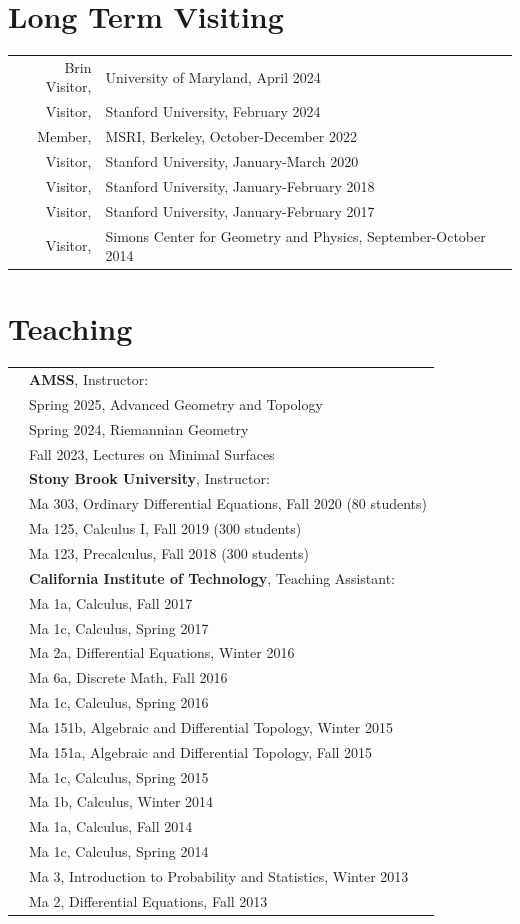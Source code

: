 \documentclass[a4paper,10pt]{article}
\begin{document}
\section*{Long Term Visiting}
\begin{tabular}{rl}
    Brin Visitor, & University of Maryland, April 2024 \\
    Visitor, & Stanford University, February 2024 \\
    Member, & MSRI, Berkeley, October-December 2022 \\
    Visitor, & Stanford University, January-March 2020 \\
    Visitor, & Stanford University, January-February 2018 \\
    Visitor, & Stanford University, January-February 2017 \\
    Visitor, & Simons Center for Geometry and Physics, September-October 2014 \\
\end{tabular}

\section*{Teaching}
\begin{tabular}{rl}
    &\textbf{AMSS}, Instructor:  \\
    &Spring 2025, Advanced Geometry and Topology \\
    &Spring 2024, Riemannian Geometry\\
    & Fall 2023, Lectures on Minimal Surfaces \\
    &\textbf{Stony Brook University}, Instructor: \\
    & Ma 303, Ordinary Differential Equations, Fall 2020 (80 students) \\
    & Ma 125, Calculus I, Fall 2019 (300 students) \\
    & Ma 123, Precalculus, Fall 2018 (300 students) \\
    &\textbf{California Institute of Technology}, Teaching Assistant: \\
    & Ma 1a, Calculus, Fall 2017 \\
    & Ma 1c, Calculus, Spring 2017 \\
    & Ma 2a, Differential Equations, Winter 2016 \\
    & Ma 6a, Discrete Math, Fall 2016 \\
    & Ma 1c, Calculus, Spring 2016 \\
    & Ma 151b, Algebraic and Differential Topology, Winter 2015 \\
    & Ma 151a, Algebraic and Differential Topology, Fall 2015 \\
    & Ma 1c, Calculus, Spring 2015 \\
    & Ma 1b, Calculus, Winter 2014 \\
    & Ma 1a, Calculus, Fall 2014 \\
    & Ma 1c, Calculus, Spring 2014 \\
    & Ma 3, Introduction to Probability and Statistics, Winter 2013 \\
    & Ma 2, Differential Equations, Fall 2013 \\
\end{tabular}
\end{document}
